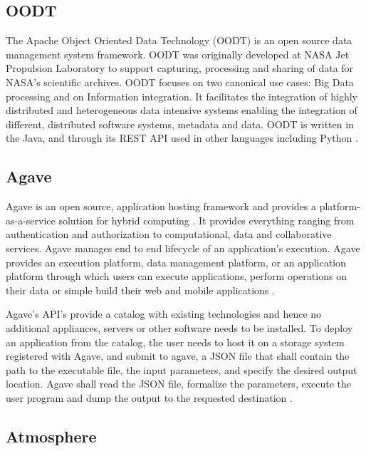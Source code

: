 \subsection{ OODT}
     
     The Apache Object Oriented Data Technology (OODT) is an open
     source data management system framework. OODT was originally
     developed at NASA Jet Propulsion Laboratory to support capturing,
     processing and sharing of data for NASA's scientific
     archives. OODT focuses on two canonical use cases: Big Data
     processing and on Information integration. It facilitates the
     integration of highly distributed and heterogeneous data
     intensive systems enabling the integration of different,
     distributed software systems, metadata and data. OODT is written
     in the Java, and through its REST API used in other languages
     including Python \cite{www-oodt2}.
     
\subsection{ Agave}

     Agave is an open source, application hosting framework and
     provides a platform-as-a-service solution for hybrid
     computing \cite{agave-paper}. It provides everything ranging
     from authentication and authorization to computational, data and
     collaborative services. Agave manages end to end lifecycle of an
     application’s execution.  Agave provides an execution platform,
     data management platform, or an application platform through
     which users can execute applications, perform operations on their
     data or simple build their web and mobile
     applications \cite{www-agaveapi-features}.

     Agave’s API’s provide a catalog with existing technologies and
     hence no additional appliances, servers or other software needs
     to be installed. To deploy an application from the catalog, the
     user needs to host it on a storage system registered with Agave,
     and submit to agave, a JSON file that shall contain the path to
     the executable file, the input parameters, and specify the
     desired output location. Agave shall read the JSON file,
     formalize the parameters, execute the user program and dump the
     output to the requested destination \cite{agave-paper}.

\subsection{ Atmosphere}


